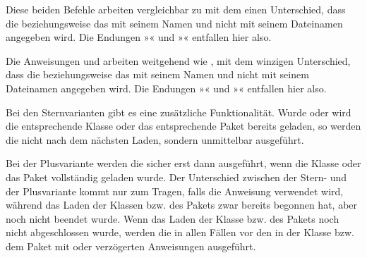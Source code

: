 \begin{Declaration}
\end{Declaration}%
Diese beiden Befehle arbeiten vergleichbar zu  mit dem einen
Unterschied, dass die  beziehungsweise das  mit
seinem Namen und nicht mit seinem Dateinamen angegeben wird. Die Endungen
»« und »« entfallen hier also.%
%
\EndIndexGroup


\begin{Declaration}
\end{Declaration}%
Die Anweisungen  und  arbeiten
weitgehend wie , mit dem winzigen
Unterschied, dass die  beziehungsweise das  mit
seinem Namen und nicht mit seinem Dateinamen angegeben wird. Die Endungen
»« und »« entfallen hier also.

Bei den
Sternvarianten gibt es eine zusätzliche Funktionalität. Wurde oder wird die
entsprechende Klasse oder das entsprechende Paket bereits geladen, so werden
die  nicht nach dem nächsten Laden, sondern unmittelbar
ausgeführt.

Bei der
Plusvariante werden die
 sicher erst dann ausgeführt, wenn die Klasse oder das
Paket vollständig geladen wurde. Der Unterschied zwischen der Stern- und der
Plusvariante kommt nur zum Tragen, falls die Anweisung verwendet wird, während
das Laden der Klassen bzw. des Pakets zwar bereits begonnen hat, aber noch
nicht beendet wurde. Wenn das Laden der Klasse bzw. des Pakets noch nicht
abgeschlossen wurde, werden die  in allen Fällen vor den in
der Klasse bzw. dem Paket mit  oder 
verzögerten Anweisungen ausgeführt.

